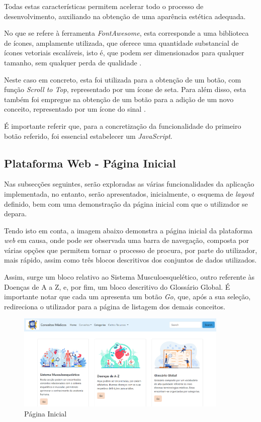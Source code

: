 Todas estas características permitem acelerar todo o processo de desenvolvimento, auxiliando na obtenção de uma aparência estética adequada.

No que se refere à ferramenta \textit{FontAwesome}, esta corresponde a uma biblioteca de ícones, amplamente utilizada, que oferece uma quantidade substancial de ícones vetoriais escaláveis, isto é, que podem ser dimensionados para qualquer tamanho, sem qualquer perda de qualidade \cite{FontAwesome2024}. 

Neste caso em concreto, esta foi utilizada para a obtenção de um botão, com função \textit{Scroll to Top}, representado por um ícone de seta. Para além disso, esta também foi empregue na obtenção de um botão para a adição de um novo conceito, representado por um ícone do sinal \+.

É importante referir que, para a concretização da funcionalidade do primeiro botão referido, foi essencial estabelecer um \textit{JavaScript}.

\subsection{Plataforma Web - Página Inicial}

Nas subsecções seguintes, serão exploradas as várias funcionalidades da aplicação implementada, no entanto, serão apresentados, inicialmente, o esquema de \textit{layout} definido, bem com uma demonstração da página inicial com que o utilizador se depara. 

Tendo isto em conta, a imagem abaixo demonstra a página inicial da plataforma \textit{web} em causa, onde pode ser observada uma barra de navegação, composta por várias opções que permitem tornar o processo de procura, por parte do utilizador, mais rápido, assim como três blocos descritivos dos conjuntos de dados utilizados.

Assim, surge um bloco relativo ao Sistema Musculoesquelético, outro referente às Doenças de A a Z, e, por fim, um bloco descritivo do Glossário Global. É importante notar que cada um apresenta um botão \textit{Go}, que, após a sua seleção, redireciona o utilizador para a página de listagem dos demais conceitos.

\begin{figure}[H]
    \centering
    \centering
    \includegraphics[width=0.9\textwidth]{Images/pag_inicial.png}
    \caption{Página Inicial}
    \label{fig:dic-traduc1}
\end{figure}

